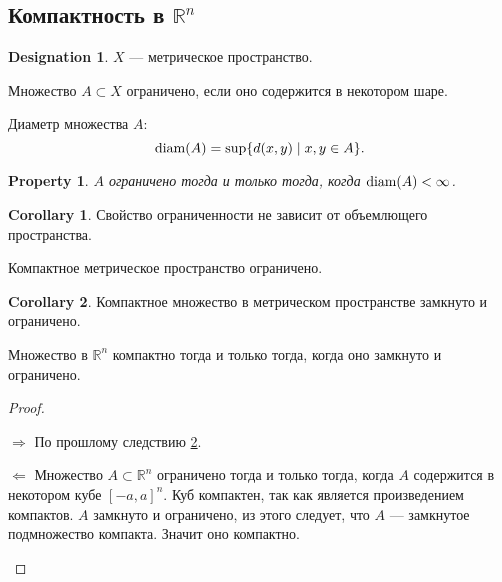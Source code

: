 \documentclass[11pt]{book}
\newcommand{\R}{\mathbb{R}}
\newcommand{\diam}{{\mathop{\text{\rm diam}}}}
\theoremstyle{definition}
\theoremstyle{plain}
\theoremstyle{plain}
\newtheorem*{prop}{Property}
\theoremstyle{definition}
\newtheorem*{cor}{Corollary}
\newtheorem*{name}{Designation}
\theoremstyle{remark}
\begin{document}
\subsection{Компактность в $ \R^{n} $ }
\begin{name}
    $ X$ --- метрическое пространство.
\end{name}
\begin{defn}
    Множество $ A \subset X$ ограничено, если оно содержится в некотором шаре.
\end{defn}
\begin{defn}
    Диаметр множества $ A$:
    \[
	\diam(A) =
	\sup \{d(x, y) \mid x, y \in  A\}
    .\]
\end{defn}
\begin{prop}
    $ A$ ограничено  тогда и только тогда, когда  $ \diam(A) < \infty$.
\end{prop}
\begin{cor}
    Свойство ограниченности не зависит от объемлющего пространства.
\end{cor}
\begin{thm}
    Компактное метрическое пространство ограничено.
\end{thm}
\begin{cor}\label{cor_comp_zo}
    Компактное множество в метрическом пространстве замкнуто и ограничено.
\end{cor}
\begin{thm}
    Множество в $ \R^{n} $ компактно тогда и только тогда, когда оно замкнуто и ограничено.
\end{thm}
\begin{proof}
    $ $
    \begin{description}
	\item $ \boxed{ \Longrightarrow }$ По прошлому следствию \ref{cor_comp_zo}.
	\item $ \boxed{ \Longleftarrow }$  Множество $ A \subset \R^{n} $ ограничено тогда и только тогда, когда $ A$ содержится в некотором кубе  $ [-a, a]^{n}$. Куб компактен, так как является произведением компактов. $ A$ замкнуто и ограничено, из этого следует, что  $ A$ --- замкнутое подмножество компакта. Значит оно компактно.
    \end{description}
\end{proof}
\end{document}
